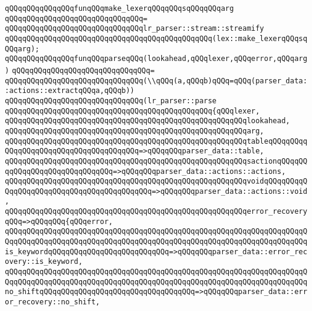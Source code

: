 \newline
\verb|qQQqqQQqqQQqqQQqfunqQQqmake_lexerqQQqqQQqsqQQqqQQqarg|\newline
\verb|qQQqqQQqqQQqqQQqqQQqqQQqqQQqqQQq=|\newline
\verb|qQQqqQQqqQQqqQQqqQQqqQQqqQQqqQQqlr_parser::stream::streamify|\newline
\verb|qQQqqQQqqQQqqQQqqQQqqQQqqQQqqQQqqQQqqQQqqQQqqQQq(lex::make_lexerqQQqsqQQqarg);|\newline
\newline
\verb|qQQqqQQqqQQqqQQqfunqQQqparseqQQq(lookahead,qQQqlexer,qQQqerror,qQQqarg)|\newline
\verb|qQQqqQQqqQQqqQQqqQQqqQQqqQQqqQQq=|\newline
\verb|qQQqqQQqqQQqqQQqqQQqqQQqqQQqqQQq(\\qQQq(a,qQQqb)qQQq=qQQq(parser_data::actions::extractqQQqa,qQQqb))|\newline
\verb|qQQqqQQqqQQqqQQqqQQqqQQqqQQqqQQq(lr_parser::parse|\newline
\verb|qQQqqQQqqQQqqQQqqQQqqQQqqQQqqQQqqQQqqQQqqQQqqQQq{qQQqlexer,|\newline
\verb|qQQqqQQqqQQqqQQqqQQqqQQqqQQqqQQqqQQqqQQqqQQqqQQqqQQqqQQqlookahead,|\newline
\verb|qQQqqQQqqQQqqQQqqQQqqQQqqQQqqQQqqQQqqQQqqQQqqQQqqQQqqQQqarg,|\newline
\verb|qQQqqQQqqQQqqQQqqQQqqQQqqQQqqQQqqQQqqQQqqQQqqQQqqQQqqQQqtableqQQqqQQqqQQqqQQqqQQqqQQqqQQqqQQqqQQqqQQq=>qQQqqQQqparser_data::table,|\newline
\verb|qQQqqQQqqQQqqQQqqQQqqQQqqQQqqQQqqQQqqQQqqQQqqQQqqQQqqQQqsactionqQQqqQQqqQQqqQQqqQQqqQQqqQQqqQQq=>qQQqqQQqparser_data::actions::actions,|\newline
\verb|qQQqqQQqqQQqqQQqqQQqqQQqqQQqqQQqqQQqqQQqqQQqqQQqqQQqqQQqvoidqQQqqQQqqQQqqQQqqQQqqQQqqQQqqQQqqQQqqQQqqQQq=>qQQqqQQqparser_data::actions::void,|\newline
\verb|qQQqqQQqqQQqqQQqqQQqqQQqqQQqqQQqqQQqqQQqqQQqqQQqqQQqqQQqerror_recoveryqQQq=>qQQqqQQq{qQQqerror,|\newline
\verb|qQQqqQQqqQQqqQQqqQQqqQQqqQQqqQQqqQQqqQQqqQQqqQQqqQQqqQQqqQQqqQQqqQQqqQQqqQQqqQQqqQQqqQQqqQQqqQQqqQQqqQQqqQQqqQQqqQQqqQQqqQQqqQQqqQQqqQQqqQQqis_keywordqQQqqQQqqQQqqQQqqQQqqQQqqQQq=>qQQqqQQqparser_data::error_recovery::is_keyword,|\newline
\verb|qQQqqQQqqQQqqQQqqQQqqQQqqQQqqQQqqQQqqQQqqQQqqQQqqQQqqQQqqQQqqQQqqQQqqQQqqQQqqQQqqQQqqQQqqQQqqQQqqQQqqQQqqQQqqQQqqQQqqQQqqQQqqQQqqQQqqQQqqQQqno_shiftqQQqqQQqqQQqqQQqqQQqqQQqqQQqqQQqqQQq=>qQQqqQQqparser_data::error_recovery::no_shift,|\newline
